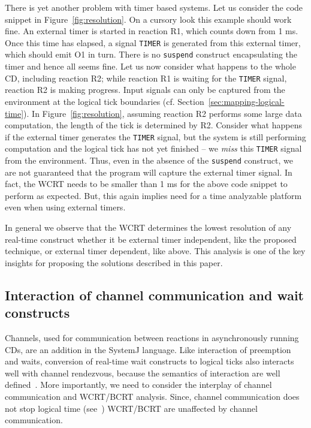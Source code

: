 There is yet another problem with timer based systems. Let us consider
the code snippet in Figure~\ref{fig:resolution}. On a cursory look this
example should work fine. An external timer is started in reaction R1,
which counts down from 1 ms. Once this time has elapsed, a signal
\texttt{TIMER} is generated from this external timer, which should emit
O1 in turn. There is no \texttt{suspend} construct encapsulating the
timer and hence all seems fine. Let us now consider what happens to the
whole CD, including reaction R2; while reaction R1 is waiting for the
\texttt{TIMER} signal, reaction R2 is making progress. Input signals can
only be captured from the environment at the logical tick boundaries
(cf. Section~\ref{sec:mapping-logical-time}). In
Figure~\ref{fig:resolution}, assuming reaction R2 performs some large
data computation, the length of the tick is determined by R2. Consider
what happens if the external timer generates the \texttt{TIMER} signal,
but the system is still performing computation and the logical tick has
not yet finished -- we \textit{miss} this \texttt{TIMER} signal from the
environment. Thus, even in the absence of the \texttt{suspend}
construct, we are not guaranteed that the program will capture the
external timer signal. In fact, the WCRT needs to be smaller than 1 ms
for the above code snippet to perform as expected. But, this again
implies need for a time analyzable platform even when using external
timers.

In general we observe that the WCRT determines the lowest resolution of
any real-time construct whether it be external timer independent, like
the proposed technique, or external timer dependent, like above. This
analysis is one of the key insights for proposing the solutions
described in this paper.


\subsection{Interaction of channel communication and wait constructs}
\label{sec:inter-chann-comm}

Channels, used for communication between reactions in asynchronously
running CDs, are an addition in the SystemJ language. Like interaction
of preemption and waits, conversion of real-time wait constructs to
logical ticks also interacts well with channel rendezvous, because the
semantics of interaction are well defined~\cite{amal10}. More
importantly, we need to consider the interplay of channel communication
and WCRT/BCRT analysis. Since, channel communication does not stop
logical time (see~\cite{amal10}) WCRT/BCRT are unaffected by channel
communication. %

